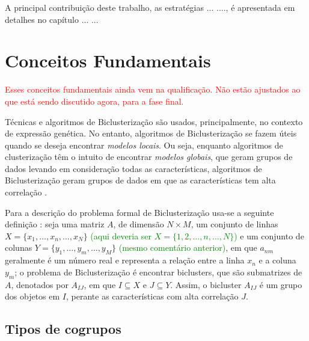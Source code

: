 \documentclass[
    12pt,                %
    oneside,            %
    a4paper,            %
    english,            %
    brazil                %
    ]{abntex2ppgsi}
\begin{document}
A principal contribuição deste trabalho, as estratégias ... ...., é apresentada em detalhes no capítulo ... ...



\chapter{Conceitos Fundamentais}
\label{ch:conceitos}

\textcolor{red}{Esses conceitos fundamentais ainda vem na qualificação. Não estão ajustados ao que está sendo discutido agora, para a fase final.}

Técnicas e algoritmos de Biclusterização são usados, principalmente, no contexto de expressão genética. No entanto, algoritmos de Biclusterização se fazem úteis quando se deseja encontrar \textit{modelos locais}. Ou seja, enquanto algoritmos de clusterização têm o intuito de encontrar \textit{modelos globais}, que geram grupos de dados levando em consideração todas as características, algoritmos de Biclusterização geram grupos de dados em que as características tem alta correlação \cite{Franca2010,Madeira2004}.


Para a descrição do problema formal de Biclusterização usa-se a seguinte definição \cite{Madeira2004}: seja uma matriz $A$, de dimensão $N \times M$, um conjunto de linhas $X = \{ x_1, \dots, x_n, \dots, x_N \}$ \textcolor{green}{(aqui deveria ser $X=\{1,2,\ldots,n,\ldots,N\}$)} e um conjunto de colunas $Y = \{ y_1, \dots, y_m, \dots, y_M \}$ \textcolor{green}{(mesmo comentário anterior)}, em que $a_{nm}$ geralmente é um número real e representa a relação entre a linha $x_n$ e a coluna $y_m$; o problema de Biclusterização é encontrar biclusters, que são submatrizes de $A$, denotados por $A_{IJ}$, em que $I \subseteq X$ e $J \subseteq Y$. Assim, o bicluster $A_{IJ}$ é um grupo dos objetos em $I$, perante as características com alta correlação $J$.

\section{Tipos de cogrupos }
\label{sec:tiposbic}
\end{document}
